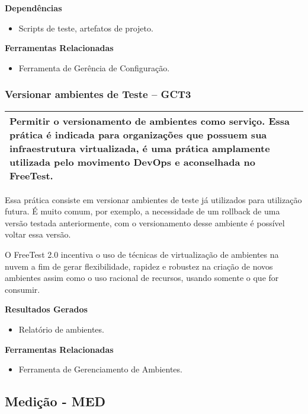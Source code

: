 \textbf{Dependências }
\begin{itemize}
    \item Scripts de teste, artefatos de projeto.
\end{itemize}

\textbf{ Ferramentas Relacionadas}
\begin{itemize}
    \item Ferramenta de Gerência de Configuração.
\end{itemize}

\subsubsection{Versionar ambientes de Teste – GCT3 }
\label{sec:gct3}

\begin{table}[!ht]
\centering
\begin{tabular}{|p{130mm}|}
\hline
Permitir o versionamento de ambientes como serviço. Essa prática é indicada para organizações que possuem sua infraestrutura virtualizada, é uma prática amplamente utilizada pelo movimento DevOps e aconselhada no FreeTest. \\ 
\hline
\end{tabular}
\end{table}

Essa prática consiste em versionar ambientes de teste já utilizados para utilização futura. É muito comum, por exemplo, a necessidade de um rollback de uma versão testada anteriormente, com o versionamento desse ambiente é possível voltar essa versão.

O FreeTest 2.0 incentiva o uso de técnicas de virtualização de ambientes na nuvem a fim de gerar flexibilidade, rapidez e robustez na criação de novos ambientes assim como o uso racional de recursos, usando somente o que for consumir.

\textbf{Resultados Gerados }
\begin{itemize}
    \item Relatório de ambientes.
\end{itemize}

\textbf{Ferramentas Relacionadas }
\begin{itemize}
    \item Ferramenta de Gerenciamento de Ambientes.
\end{itemize}

\subsection{Medição - MED}
\label{sec:med}

